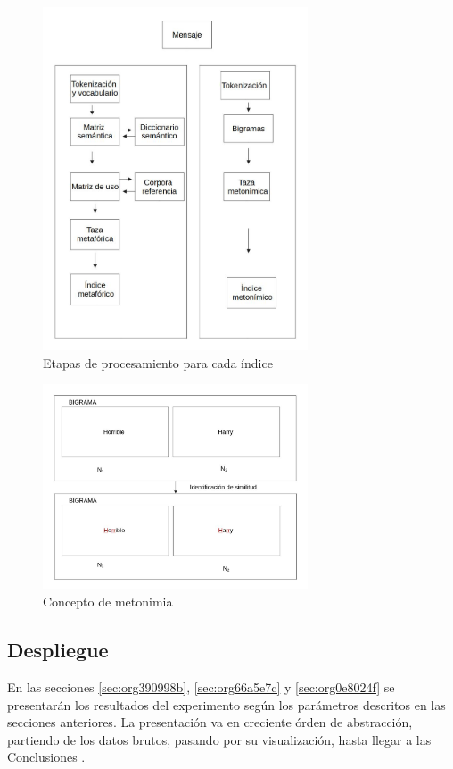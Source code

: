 \documentclass[12pt,letterpaper,twoside]{article}
\begin{document}
\begin{figure}[H]
\centering
\includegraphics[width=0.7\textwidth]{./assets/metodologia.jpg}
\caption{\label{fig:metodologia}Etapas de procesamiento para cada índice}
\end{figure}

\begin{figure}[H]
\centering
\includegraphics[width=0.7\textwidth]{./assets/metonimia.jpg}
\caption{\label{fig:metonimia}Concepto de metonimia}
\end{figure}

\subsection{Despliegue}
\label{sec:org1e226d2}
En las secciones \ref{sec:org390998b}, \ref{sec:org66a5e7c} y
\ref{sec:org0e8024f} se presentarán los resultados del experimento
según los parámetros descritos en las secciones anteriores.
La presentación va en creciente órden de abstracción, partiendo
de los datos brutos, pasando por su visualización, hasta llegar
a las Conclusiones .
\end{document}
